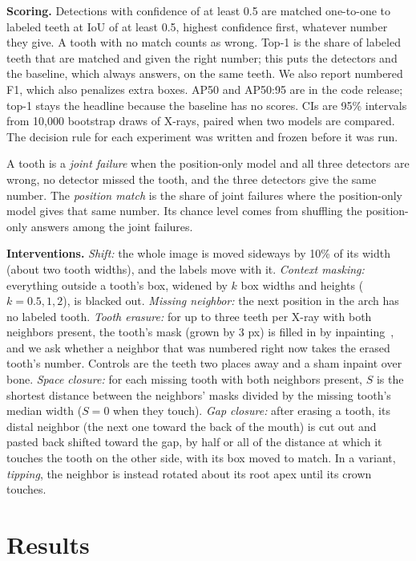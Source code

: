 \documentclass[runningheads]{llncs}
\begin{document}
\textbf{Scoring.} Detections with confidence of at least 0.5 are matched
one-to-one to labeled teeth at IoU of at least 0.5, highest confidence
first, whatever number they give. A tooth with no match counts as wrong.
Top-1 is the share of labeled teeth that are matched and given the right
number; this puts the detectors and the baseline, which always answers, on
the same teeth. We also report numbered F1, which also penalizes extra
boxes. AP50 and AP50:95 are in the code release; top-1 stays the headline
because the baseline has no scores. CIs are 95\% intervals from 10,000
bootstrap draws of X-rays, paired when two models are compared. The decision
rule for each experiment was written and frozen before it was run.

A tooth is a \emph{joint failure} when the position-only model and all three
detectors are wrong, no detector missed the tooth, and the three detectors
give the same number. The \emph{position match} is the share of joint
failures where the position-only model gives that same number. Its chance
level comes from shuffling the position-only answers among the joint
failures.

\textbf{Interventions.} \emph{Shift:} the whole image is moved sideways by
10\% of its width (about two tooth widths), and the labels move with it.
\emph{Context masking:} everything outside a tooth's box, widened by $k$ box
widths and heights ($k=0.5,1,2$), is blacked out. \emph{Missing neighbor:}
the next position in the arch has no labeled tooth. \emph{Tooth erasure:}
for up to three teeth per X-ray with both neighbors present, the tooth's
mask (grown by 3 px) is filled in by inpainting~\cite{telea2004inpainting},
and we ask whether a neighbor that was numbered right now takes the erased
tooth's number. Controls are the teeth two places away and a sham inpaint
over bone. \emph{Space closure:} for each missing tooth with both neighbors
present, $S$ is the shortest distance between the neighbors' masks divided
by the missing tooth's median width ($S=0$ when they touch). \emph{Gap
closure:} after erasing a tooth, its distal neighbor (the next one toward
the back of the mouth) is cut out and pasted back shifted toward the gap, by
half or all of the distance at which it touches the tooth on the other side,
with its box moved to match. In a variant, \emph{tipping}, the neighbor is
instead rotated about its root apex until its crown touches.

\section{Results}
\end{document}
